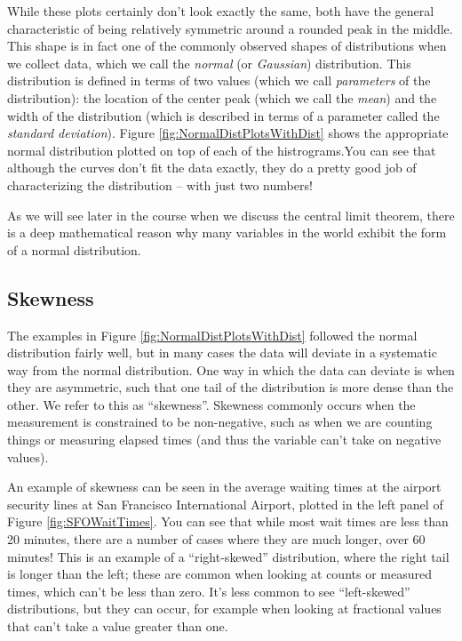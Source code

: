 \documentclass[]{book}
\theoremstyle{definition}
\theoremstyle{definition}
\theoremstyle{definition}
\theoremstyle{remark}
\begin{document}
While these plots certainly don't look exactly the same, both have the
general characteristic of being relatively symmetric around a rounded
peak in the middle. This shape is in fact one of the commonly observed
shapes of distributions when we collect data, which we call the
\emph{normal} (or \emph{Gaussian}) distribution. This distribution is
defined in terms of two values (which we call \emph{parameters} of the
distribution): the location of the center peak (which we call the
\emph{mean}) and the width of the distribution (which is described in
terms of a parameter called the \emph{standard deviation}). Figure
\ref{fig:NormalDistPlotsWithDist} shows the appropriate normal
distribution plotted on top of each of the histrograms.You can see that
although the curves don't fit the data exactly, they do a pretty good
job of characterizing the distribution -- with just two numbers!

As we will see later in the course when we discuss the central limit
theorem, there is a deep mathematical reason why many variables in the
world exhibit the form of a normal distribution.

\subsection{Skewness}\label{skewness}

The examples in Figure \ref{fig:NormalDistPlotsWithDist} followed the
normal distribution fairly well, but in many cases the data will deviate
in a systematic way from the normal distribution. One way in which the
data can deviate is when they are asymmetric, such that one tail of the
distribution is more dense than the other. We refer to this as
``skewness''. Skewness commonly occurs when the measurement is
constrained to be non-negative, such as when we are counting things or
measuring elapsed times (and thus the variable can't take on negative
values).

An example of skewness can be seen in the average waiting times at the
airport security lines at San Francisco International Airport, plotted
in the left panel of Figure \ref{fig:SFOWaitTimes}. You can see that
while most wait times are less than 20 minutes, there are a number of
cases where they are much longer, over 60 minutes! This is an example of
a ``right-skewed'' distribution, where the right tail is longer than the
left; these are common when looking at counts or measured times, which
can't be less than zero. It's less common to see ``left-skewed''
distributions, but they can occur, for example when looking at
fractional values that can't take a value greater than one.
\end{document}
